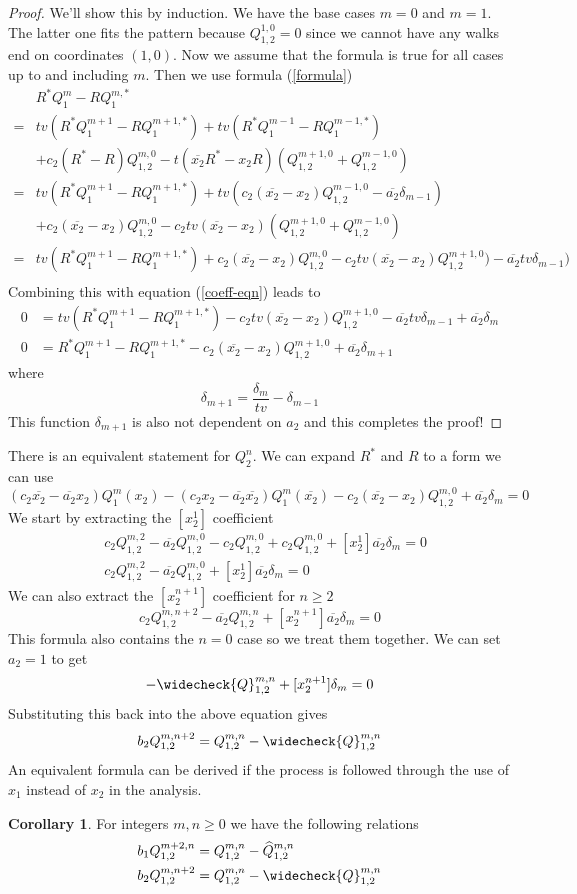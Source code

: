 \documentclass[12pt]{article}
\theoremstyle{definition} \newtheorem{definition}[theorem]{Definition}
\newtheorem{corollary}[theorem]{Corollary}
\newcommand{\ol}[1]{\overline{#1}}
\newcommand{\Qf}[1]{Q_{1,2}^{#1}}
\newcommand{\wh}{\widehat}
\newcommand{\wc}{\widecheck}
\begin{document}
\begin{proof}We'll show this by induction. We have the base cases $m = 0$ and $m=1$. The latter one fits the pattern because $\Qf{1,0} = 0$ since we cannot have any walks end on coordinates $(1,0)$. Now we assume that the formula is true for all cases up to and including $m$. Then we use formula (\ref{formula})
\begin{align*}
& R^\ast Q_1^m -R Q_1^{m,\ast}\\
=&tv(R^\ast Q_1^{m+1}-R Q_1^{m+1,\ast}) + tv(R^\ast Q_1^{m-1}-R Q_1^{m-1,\ast})\\
& + c_2(R^\ast-R)\Qf{m,0}-t(\ol{x_2}R^\ast-x_2 R)(\Qf{m+1,0}+\Qf{m-1,0})\\
=& tv(R^\ast Q_1^{m+1}-R Q_1^{m+1,\ast}) + tv(c_2(\ol{x_2}-x_2)\Qf{m-1,0}-\ol{a_2}\delta_{m-1})\\
& + c_2(\ol{x_2}-x_2)\Qf{m,0}-c_2tv(\ol{x_2}-x_2)(\Qf{m+1,0}+\Qf{m-1,0})\\
=& tv(R^\ast Q_1^{m+1}-R Q_1^{m+1,\ast})+ c_2(\ol{x_2}-x_2)\Qf{m,0}-c_2tv(\ol{x_2}-x_2)\Qf{m+1,0}) - \ol{a_2}tv\delta_{m-1})\\
\end{align*}
Combining this with equation (\ref{coeff-eqn}) leads to
\begin{align*}
0 &= tv(R^\ast Q_1^{m+1}-R Q_1^{m+1,\ast})-c_2tv(\ol{x_2}-x_2)\Qf{m+1,0} - \ol{a_2}tv\delta_{m-1} +\ol{a_2}\delta_m \\
 0 & = R^\ast Q_1^{m+1}-R Q_1^{m+1,\ast}-c_2(\ol{x_2}-x_2)\Qf{m+1,0}+ \ol{a_2}\delta_{m+1}
\end{align*}
where
\[
  \delta_{m+1} =\frac{\delta_m}{tv}-\delta_{m-1}
\]
This function $\delta_{m+1}$ is also not dependent on $a_2$ and this completes the proof!
\end{proof}
There is an equivalent statement for $Q_2^n$. We can expand $R^\ast$ and $R$ to a form we can use
\[
(c_2\ol{x_2}-\ol{a_2}x_2)Q_1^m(x_2) -( c_2x_2-\ol{a_2}\ol{x_2})Q_1^m(\ol{x_2}) - c_2(\ol{x_2}-x_2)\Qf{m,0} +\ol{a_2}\delta_m = 0
\]
We start by extracting the $[x_2^1]$ coefficient
\begin{align*}
& c_2\Qf{m,2}-\ol{a_2}\Qf{m,0}-c_2\Qf{m,0} +c_2\Qf{m,0}+ [x_2^1]\ol{a_2}\delta_m = 0\\
& c_2\Qf{m,2}-\ol{a_2}\Qf{m,0}+ [x_2^1]\ol{a_2}\delta_m = 0
\end{align*}
We can also extract the $[x_2^{n+1}]$ coefficient for $n\geq 2$
\[
  c_2 Q_{1,2}^{m,n+2}-\ol{a_2}Q_{1,2}^{m,n}+[x_2^{n+1}]\ol{a_2}\delta_m= 0
\]
This formula also contains the $n = 0$ case so we treat them together. We can set $a_2 = 1$ to get
\[
    -\wc{Q}_{1,2}^{m,n}+[x_2^{n+1}]\delta_m = 0
\]
Substituting this back into the above equation gives
\[
     b_2 Q_{1,2}^{m,n+2} = Q_{1,2}^{m,n} - \wc{Q}_{1,2}^{m,n}
\]
An equivalent formula can be derived if the process is followed through the use of $x_1$ instead of $x_2$ in the analysis.
\begin{corollary} For integers $m,n \ge 0$ we have the following relations
\begin{align*}
b_1 \Qf{m+2,n} &= Q_{1,2}^{m,n}-\wh{Q}_{1,2}^{m,n}\\
b_2 \Qf{m,n+2} &= Q_{1,2}^{m,n}-\wc{Q}_{1,2}^{m,n}
\end{align*}
\end{corollary}
\end{document}
